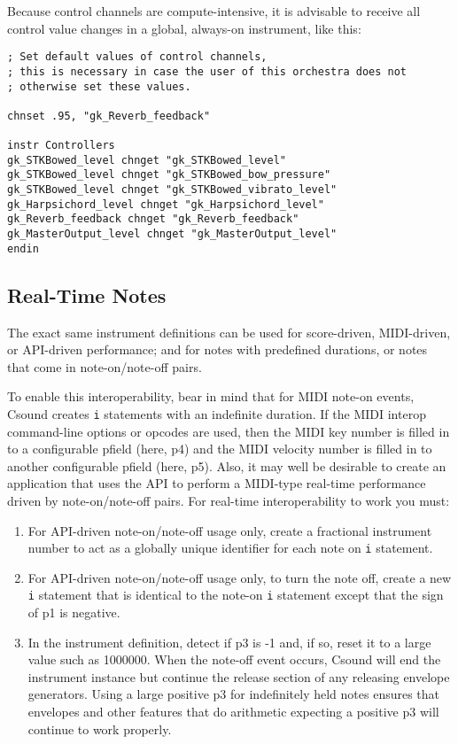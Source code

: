 \documentclass[12pt,letterpaper,onecolumn]{scrartcl}
\begin{document}
\begin{enumerate}
Because control channels are compute-intensive, it is advisable to receive all control value changes in a global, always-on instrument, like this:

\begin{lstlisting}
; Set default values of control channels,
; this is necessary in case the user of this orchestra does not
; otherwise set these values.

chnset .95, "gk_Reverb_feedback"

instr Controllers
gk_STKBowed_level chnget "gk_STKBowed_level"
gk_STKBowed_level chnget "gk_STKBowed_bow_pressure"
gk_STKBowed_level chnget "gk_STKBowed_vibrato_level"
gk_Harpsichord_level chnget "gk_Harpsichord_level"
gk_Reverb_feedback chnget "gk_Reverb_feedback"
gk_MasterOutput_level chnget "gk_MasterOutput_level"
endin
\end{lstlisting}

\subsection{Real-Time Notes}

The exact same instrument definitions can be used for score-driven, MIDI-driven, or API-driven performance; and for notes with predefined durations, or notes that come in note-on/note-off pairs.

To enable this interoperability, bear in mind that for MIDI note-on events, Csound creates \texttt{i} statements with an indefinite duration. If the MIDI interop command-line options or opcodes are used, then the MIDI key number is filled in to a configurable pfield (here, p4) and the MIDI velocity number is filled in to another configurable pfield (here, p5). Also, it may well be desirable to create an application that uses the API to perform a MIDI-type real-time performance driven by note-on/note-off pairs. For real-time interoperability to work you must:

\begin{enumerate}
    \item For API-driven note-on/note-off usage only, create a fractional instrument number to act as a globally unique identifier for each note on \texttt{i} statement.
    \item For API-driven note-on/note-off usage only, to turn the note off, create a new \texttt{i} statement that is identical to the note-on \texttt{i} statement except that the sign of p1 is negative.
    \item In the instrument definition, detect if p3 is -1 and, if so, reset it to a large value such as 1000000. When the note-off event occurs, Csound will end the instrument instance but continue the release section of any releasing envelope generators. Using a large positive p3 for indefinitely held notes ensures that envelopes and other features that do arithmetic expecting a positive p3 will continue to work properly.
\end{enumerate}
		
\end{enumerate}
\end{document}
